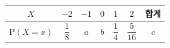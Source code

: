 {\setlength{\tabcolsep}{6pt}\renewcommand{\arraystretch}{1.8}%
\begin{tabular}{|c|c|c|c|c|c|c|}
\hline
$X$ & $-2$ & $-1$ & $0$ & $1$ & $2$ & \textbf{합계} \\
\hline
$\mathrm{P}(X=x)$ & $\dfrac{1}{8}$ & $a$ & $b$ & $\dfrac{1}{4}$ & $\dfrac{5}{16}$ & $c$ \\
\hline
\end{tabular}}
